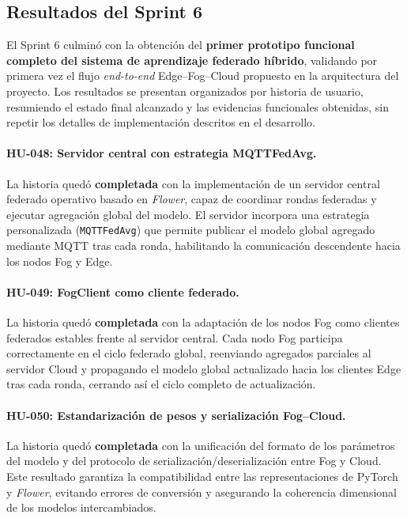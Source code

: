\documentclass{report}
\begin{document}
\subsection{Resultados del Sprint 6}
El Sprint 6 culminó con la obtención del \textbf{primer prototipo funcional completo del sistema de aprendizaje federado híbrido}, validando por primera vez el flujo \emph{end-to-end} Edge--Fog--Cloud propuesto en la arquitectura del proyecto. Los resultados se presentan organizados por historia de usuario, resumiendo el estado final alcanzado y las evidencias funcionales obtenidas, sin repetir los detalles de implementación descritos en el desarrollo.

\vspace{0.15em}
\paragraph{HU-048: Servidor central con estrategia MQTTFedAvg.}
La historia quedó \textbf{completada} con la implementación de un servidor central federado operativo basado en \textit{Flower}, capaz de coordinar rondas federadas y ejecutar agregación global del modelo. El servidor incorpora una estrategia personalizada (\texttt{MQTTFedAvg}) que permite publicar el modelo global agregado mediante MQTT tras cada ronda, habilitando la comunicación descendente hacia los nodos Fog y Edge.

\vspace{0.15em}
\paragraph{HU-049: FogClient como cliente federado.}
La historia quedó \textbf{completada} con la adaptación de los nodos Fog como clientes federados estables frente al servidor central. Cada nodo Fog participa correctamente en el ciclo federado global, reenviando agregados parciales al servidor Cloud y propagando el modelo global actualizado hacia los clientes Edge tras cada ronda, cerrando así el ciclo completo de actualización.

\vspace{0.15em}
\paragraph{HU-050: Estandarización de pesos y serialización Fog--Cloud.}
La historia quedó \textbf{completada} con la unificación del formato de los parámetros del modelo y del protocolo de serialización/deserialización entre Fog y Cloud. Este resultado garantiza la compatibilidad entre las representaciones de PyTorch y \textit{Flower}, evitando errores de conversión y asegurando la coherencia dimensional de los modelos intercambiados.
\end{document}

